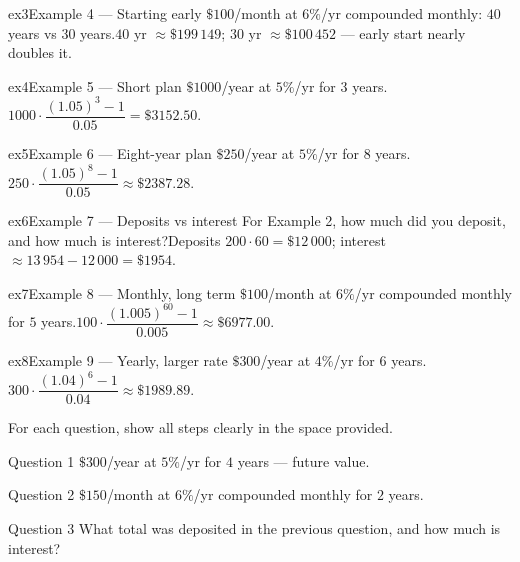 \documentclass[11pt]{article}
\begin{document}
\begin{example}{ex3}{Example 4 --- Starting early}
$\$100$/month at $6\%$/yr compounded monthly: $40$ years vs $30$ years.\soln $40$ yr $\approx\$199\,149$; $30$ yr $\approx\$100\,452$ — early start nearly doubles it.
\end{example}

\begin{example}{ex4}{Example 5 --- Short plan}
$\$1000$/year at $5\%$/yr for $3$ years.\soln $1000\cdot\dfrac{(1.05)^{3}-1}{0.05}=\$3152.50$.
\end{example}

\begin{example}{ex5}{Example 6 --- Eight-year plan}
$\$250$/year at $5\%$/yr for $8$ years.\soln $250\cdot\dfrac{(1.05)^{8}-1}{0.05}\approx\$2387.28$.
\end{example}

\begin{example}{ex6}{Example 7 --- Deposits vs interest}
For Example 2, how much did you deposit, and how much is interest?\soln Deposits $200\cdot60=\$12\,000$; interest $\approx13\,954-12\,000=\$1954$.
\end{example}

\begin{example}{ex7}{Example 8 --- Monthly, long term}
$\$100$/month at $6\%$/yr compounded monthly for $5$ years.\soln $100\cdot\dfrac{(1.005)^{60}-1}{0.005}\approx\$6977.00$.
\end{example}

\begin{example}{ex8}{Example 9 --- Yearly, larger rate}
$\$300$/year at $4\%$/yr for $6$ years.\soln $300\cdot\dfrac{(1.04)^{6}-1}{0.04}\approx\$1989.89$.
\end{example}

\clearpage
{}
For each question, show all steps clearly in the space provided.

\begin{qbox}{Question 1}
$\$300$/year at $5\%$/yr for $4$ years — future value.\workspace{2.4cm}
\end{qbox}

\begin{qbox}{Question 2}
$\$150$/month at $6\%$/yr compounded monthly for $2$ years.\workspace{2.4cm}
\end{qbox}

\begin{qbox}{Question 3}
What total was deposited in the previous question, and how much is interest?\workspace{2.4cm}
\end{qbox}
\end{document}
